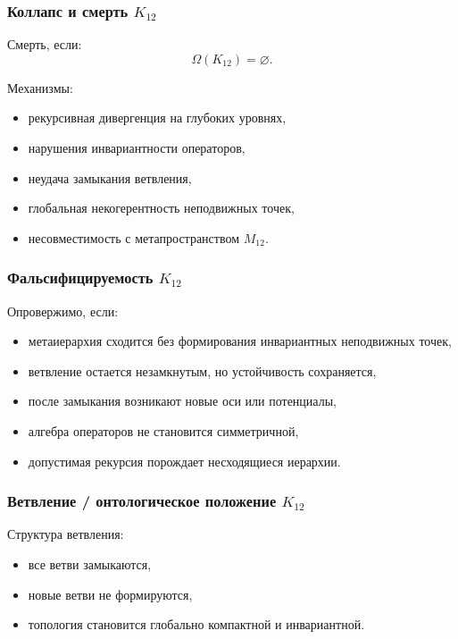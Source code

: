 \subsubsection{Коллапс и смерть $K_{12}$}

Смерть, если:
\[
\Omega(K_{12})=\varnothing.
\]

Механизмы:
\begin{itemize}
    \item рекурсивная дивергенция на глубоких уровнях,
    \item нарушения инвариантности операторов,
    \item неудача замыкания ветвления,
    \item глобальная некогерентность неподвижных точек,
    \item несовместимость с метапространством $M_{12}$.
\end{itemize}

\subsubsection{Фальсифицируемость $K_{12}$}

Опровержимо, если:
\begin{itemize}
    \item метаиерархия сходится без формирования инвариантных неподвижных точек,
    \item ветвление остается незамкнутым, но устойчивость сохраняется,
    \item после замыкания возникают новые оси или потенциалы,
    \item алгебра операторов не становится симметричной,
    \item допустимая рекурсия порождает несходящиеся иерархии.
\end{itemize}

\subsubsection{Ветвление / онтологическое положение $K_{12}$}

Структура ветвления:
\begin{itemize}
    \item все ветви замыкаются,
    \item новые ветви не формируются,
    \item топология становится глобально компактной и инвариантной.
\end{itemize}

